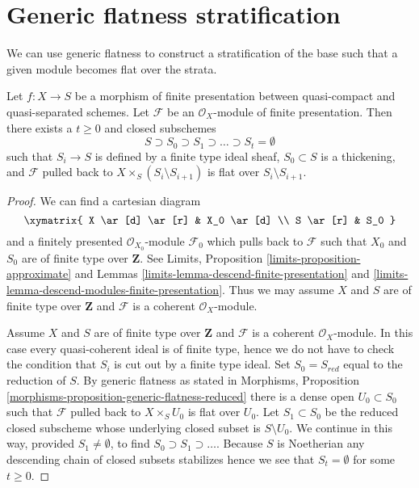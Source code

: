 \section{Generic flatness stratification}
\label{section-generic-flatness-stratification}

\noindent
We can use generic flatness to construct a
stratification of the base such that a given module
becomes flat over the strata.

\begin{lemma}
\label{lemma-generic-flatness-stratification}
Let $f : X \to S$ be a morphism of finite presentation between quasi-compact
and quasi-separated schemes. Let $\mathcal{F}$ be an $\mathcal{O}_X$-module
of finite presentation. Then there exists a $t \geq 0$ and closed
subschemes
$$
S \supset S_0 \supset S_1 \supset \ldots \supset S_t = \emptyset
$$
such that $S_i \to S$ is defined by a finite type ideal sheaf,
$S_0 \subset S$ is a thickening, and $\mathcal{F}$ pulled back to
$X \times_S (S_i \setminus S_{i + 1})$ is flat over $S_i \setminus S_{i + 1}$.
\end{lemma}

\begin{proof}
We can find a cartesian diagram
$$
\xymatrix{
X \ar[d] \ar[r] & X_0 \ar[d] \\
S \ar[r] & S_0
}
$$
and a finitely presented $\mathcal{O}_{X_0}$-module $\mathcal{F}_0$
which pulls back to $\mathcal{F}$ such that $X_0$ and $S_0$ are of
finite type over $\mathbf{Z}$. See
Limits, Proposition \ref{limits-proposition-approximate} and
Lemmas \ref{limits-lemma-descend-finite-presentation} and
\ref{limits-lemma-descend-modules-finite-presentation}.
Thus we may assume $X$ and $S$ are of finite type over $\mathbf{Z}$
and $\mathcal{F}$ is a coherent $\mathcal{O}_X$-module.

\medskip\noindent
Assume $X$ and $S$ are of finite type over $\mathbf{Z}$
and $\mathcal{F}$ is a coherent $\mathcal{O}_X$-module.
In this case every quasi-coherent ideal is of finite type, hence
we do not have to check the condition that $S_i$ is cut out
by a finite type ideal. Set $S_0 = S_{red}$ equal to the reduction of $S$.
By generic flatness as stated in Morphisms, Proposition
\ref{morphisms-proposition-generic-flatness-reduced}
there is a dense open $U_0 \subset S_0$ such that $\mathcal{F}$
pulled back to $X \times_S U_0$ is flat over $U_0$.
Let $S_1 \subset S_0$ be the reduced closed subscheme whose
underlying closed subset is $S \setminus U_0$. We continue in this
way, provided $S_1 \not = \emptyset$, to find
$S_0 \supset S_1 \supset \ldots$. Because $S$
is Noetherian any descending chain of closed subsets stabilizes
hence we see that $S_t = \emptyset$ for some $t \geq 0$.
\end{proof}

